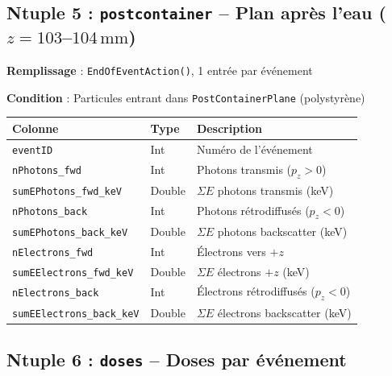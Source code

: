 \documentclass[11pt,a4paper]{article}
\newcommand{\code}[1]{\texttt{#1}}
\newcommand{\unit}[1]{\ensuremath{\,\mathrm{#1}}}
\begin{document}
\subsection{Ntuple 5 : \code{postcontainer} -- Plan après l'eau ($z = 103$--$104$\unit{mm})}

\textbf{Remplissage} : \code{EndOfEventAction()}, 1 entrée par événement

\textbf{Condition} : Particules entrant dans \code{PostContainerPlane} (polystyrène)

\begin{table}[h]
\centering
\begin{tabular}{p{4.5cm} p{2cm} p{7cm}}
    \toprule
    \rowcolor{headerblue!20}
    \textbf{Colonne} & \textbf{Type} & \textbf{Description} \\
    \midrule
    \code{eventID} & Int & Numéro de l'événement \\
    \rowcolor{lightgray}
    \code{nPhotons\_fwd} & Int & Photons transmis ($p_z > 0$) \\
    \code{sumEPhotons\_fwd\_keV} & Double & $\Sigma E$ photons transmis (keV) \\
    \rowcolor{lightgray}
    \code{nPhotons\_back} & Int & Photons rétrodiffusés ($p_z < 0$) \\
    \code{sumEPhotons\_back\_keV} & Double & $\Sigma E$ photons backscatter (keV) \\
    \rowcolor{lightgray}
    \code{nElectrons\_fwd} & Int & Électrons vers $+z$ \\
    \code{sumEElectrons\_fwd\_keV} & Double & $\Sigma E$ électrons $+z$ (keV) \\
    \rowcolor{lightgray}
    \code{nElectrons\_back} & Int & Électrons rétrodiffusés ($p_z < 0$) \\
    \code{sumEElectrons\_back\_keV} & Double & $\Sigma E$ électrons backscatter (keV) \\
    \bottomrule
\end{tabular}
\end{table}

\subsection{Ntuple 6 : \code{doses} -- Doses par événement}
\end{document}
